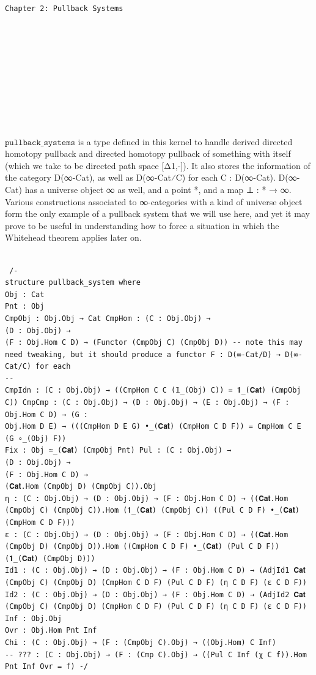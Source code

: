 \documentclass{book}
\theoremstyle{definition}
\newcounter{pcounter}
\newcounter{lcounter}
\newcounter{sectioncount}
\newcounter{subsectioncount}
\renewcommand{\section}[1]{\newpage\ \\ \ \\ \begin{center} \scalebox{1.5}{\texttt{\thesectioncount . #1}} \stepcounter{sectioncount} \setcounter{subsectioncount}{1} \end{center} \begin{center} \ \\ \ \\ \thispagestyle{empty} \end{center}}
\renewcommand{\chapter}[1]{
\newpage
{
\Huge 
\begin{center}
\ \\
\ \\
\thispagestyle{empty}
\texttt{#1}
\end{center}}
\ \\
\ \\
}
\begin{document}
\iffalse

  \chapter{Chapter 2: Pullback Systems} \\\
\\\
\section{$\texttt{pullback\_systems}$}
$\texttt{pullback\_systems}$ is a type defined in this kernel to handle derived directed homotopy pullback and directed homotopy pullback of something with itself (which we take to be directed path space [Δ1,-]). It also stores the information of the category D(∞-Cat), as well as D(∞-Cat⁄C) for each C : D(∞-Cat). D(∞-Cat) has a universe object ∞ as well, and a point *, and a map ⊥ : * → ∞. Various constructions associated to ∞-categories with a kind of universe object form the only example of a pullback system that we will use here, and yet it may prove to be useful in understanding how to force a situation in which the Whitehead theorem applies later on. \\
\begin{center} \begin{tcolorbox}[width=5in,colback={white},title={\begin{center}\texttt{Lean \thelcounter} \addtocounter{lcounter}{1} \end{center}},colbacktitle=Blue,coltitle=black] \begin{verbatim}

 /-
structure pullback_system where
Obj : Cat
Pnt : Obj
CmpObj : Obj.Obj → Cat CmpHom : (C : Obj.Obj) →
(D : Obj.Obj) →
(F : Obj.Hom C D) → (Functor (CmpObj C) (CmpObj D)) -- note this may need tweaking, but it should produce a functor F : D(∞-Cat/D) → D(∞-Cat/C) for each
--
CmpIdn : (C : Obj.Obj) → ((CmpHom C C (𝟙_(Obj) C)) = 𝟏_(𝐂𝐚𝐭) (CmpObj C)) CmpCmp : (C : Obj.Obj) → (D : Obj.Obj) → (E : Obj.Obj) → (F : Obj.Hom C D) → (G :
Obj.Hom D E) → (((CmpHom D E G) •_(𝐂𝐚𝐭) (CmpHom C D F)) = CmpHom C E (G ∘_(Obj) F))
Fix : Obj ≃_(𝐂𝐚𝐭) (CmpObj Pnt) Pul : (C : Obj.Obj) →
(D : Obj.Obj) →
(F : Obj.Hom C D) →
(𝐂𝐚𝐭.Hom (CmpObj D) (CmpObj C)).Obj
η : (C : Obj.Obj) → (D : Obj.Obj) → (F : Obj.Hom C D) → ((𝐂𝐚𝐭.Hom (CmpObj C) (CmpObj C)).Hom (𝟏_(𝐂𝐚𝐭) (CmpObj C)) ((Pul C D F) •_(𝐂𝐚𝐭) (CmpHom C D F)))
ε : (C : Obj.Obj) → (D : Obj.Obj) → (F : Obj.Hom C D) → ((𝐂𝐚𝐭.Hom (CmpObj D) (CmpObj D)).Hom ((CmpHom C D F) •_(𝐂𝐚𝐭) (Pul C D F)) (𝟏_(𝐂𝐚𝐭) (CmpObj D)))
Id1 : (C : Obj.Obj) → (D : Obj.Obj) → (F : Obj.Hom C D) → (AdjId1 𝐂𝐚𝐭 (CmpObj C) (CmpObj D) (CmpHom C D F) (Pul C D F) (η C D F) (ε C D F))
Id2 : (C : Obj.Obj) → (D : Obj.Obj) → (F : Obj.Hom C D) → (AdjId2 𝐂𝐚𝐭 (CmpObj C) (CmpObj D) (CmpHom C D F) (Pul C D F) (η C D F) (ε C D F))
Inf : Obj.Obj
Ovr : Obj.Hom Pnt Inf
Chi : (C : Obj.Obj) → (F : (CmpObj C).Obj) → ((Obj.Hom) C Inf)
-- ??? : (C : Obj.Obj) → (F : (Cmp C).Obj) → ((Pul C Inf (χ C f)).Hom Pnt Inf Ovr = f) -/
\end{verbatim} \end{tcolorbox} \end{center}
\end{document}

